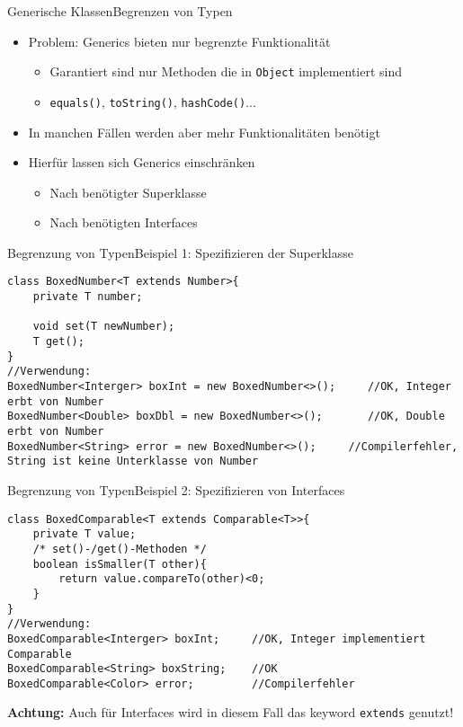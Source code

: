 \begin{frame}{Generische Klassen}{Begrenzen von Typen}
    \begin{itemize}
        \item Problem: Generics bieten nur begrenzte Funktionalität
        \begin{itemize}
            \item Garantiert sind nur Methoden die in \texttt{Object} implementiert sind
            \item \texttt{equals()}, \texttt{toString()}, \texttt{hashCode()}...
        \end{itemize}
        \item In manchen Fällen werden aber mehr Funktionalitäten benötigt
        \item Hierfür lassen sich Generics einschränken
        \begin{itemize}
            \item Nach benötigter Superklasse
            \item Nach benötigten Interfaces
        \end{itemize}
    \end{itemize}
\end{frame}

\begin{frame}[fragile]{Begrenzung von Typen}{Beispiel 1: Spezifizieren der Superklasse}
\lstset{style=javacode}
\begin{lstlisting}
class BoxedNumber<T extends Number>{
    private T number;
    
    void set(T newNumber);
    T get();
}
//Verwendung:
BoxedNumber<Interger> boxInt = new BoxedNumber<>();     //OK, Integer erbt von Number
BoxedNumber<Double> boxDbl = new BoxedNumber<>();       //OK, Double erbt von Number
BoxedNumber<String> error = new BoxedNumber<>();     //Compilerfehler, String ist keine Unterklasse von Number
\end{lstlisting}
\end{frame}

\begin{frame}[fragile]{Begrenzung von Typen}{Beispiel 2: Spezifizieren von Interfaces}
\lstset{style=javacode}
\begin{lstlisting}
class BoxedComparable<T extends Comparable<T>>{
    private T value;
    /* set()-/get()-Methoden */
    boolean isSmaller(T other){
        return value.compareTo(other)<0;
    }
}
//Verwendung:
BoxedComparable<Interger> boxInt;     //OK, Integer implementiert Comparable
BoxedComparable<String> boxString;    //OK
BoxedComparable<Color> error;         //Compilerfehler
\end{lstlisting}
\textbf{Achtung:} Auch für Interfaces wird in diesem Fall das keyword \texttt{extends} genutzt!
\end{frame}

